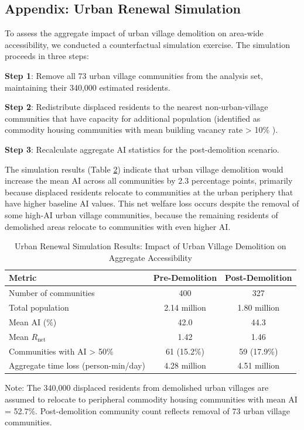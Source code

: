 \documentclass[10pt,conference,compsoc]{IEEEtran}
\begin{document}
\begin{table}[htbp]
\begin{center}
\section{Appendix: Urban Renewal Simulation}
\label{appendix:simulation}

To assess the aggregate impact of urban village demolition on area-wide accessibility, we conducted a counterfactual simulation exercise. The simulation proceeds in three steps:

\textbf{Step 1}: Remove all 73 urban village communities from the analysis set, maintaining their 340{,}000 estimated residents.

\textbf{Step 2}: Redistribute displaced residents to the nearest non-urban-village communities that have capacity for additional population (identified as commodity housing communities with mean building vacancy rate > 10\% ).

\textbf{Step 3}: Recalculate aggregate AI statistics for the post-demolition scenario.

The simulation results (Table \ref{tab:simulation_results}) indicate that urban village demolition would increase the mean AI across all communities by 2.3 percentage points, primarily because displaced residents relocate to communities at the urban periphery that have higher baseline AI values. This net welfare loss occurs despite the removal of some high-AI urban village communities, because the remaining residents of demolished areas relocate to communities with even higher AI.

\begin{table}[htbp]
\caption{Urban Renewal Simulation Results: Impact of Urban Village Demolition on Aggregate Accessibility}
\label{tab:simulation_results}
\begin{center}
\begin{threeparttable}
\begin{tabular}{lcc}
\toprule
Metric & Pre-Demolition & Post-Demolition \\
\midrule
Number of communities & 400 & 327 \\
Total population & 2.14 million & 1.80 million \\
Mean AI ($\%$) & 42.0 & 44.3 \\
Mean $R_{\text{net}}$ & 1.42 & 1.46 \\
Communities with AI > 50\% & 61 (15.2\%) & 59 (17.9\%) \\
Aggregate time loss (person-min/day) & 4.28 million & 4.51 million \\
\bottomrule
\end{tabular}
\begin{tablenotes}
\item Note: The 340{,}000 displaced residents from demolished urban villages are assumed to relocate to peripheral commodity housing communities with mean AI = 52.7\%. Post-demolition community count reflects removal of 73 urban village communities.
\end{tablenotes}
\end{threeparttable}
\end{center}
\end{table}


\end{center}
\end{table}
\end{document}
